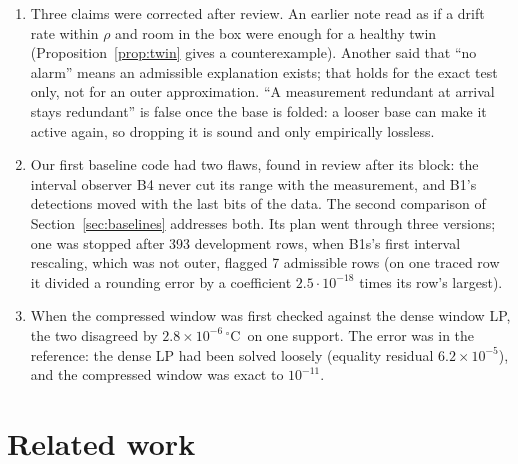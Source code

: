 \documentclass[11pt,a4paper]{article}
\newcommand{\degC}{\ensuremath{{}^\circ}C}
\newcommand{\sci}[2]{\ensuremath{#1\times10^{#2}}}
\begin{document}
\begin{enumerate}
  the first validation already showed it: the float32 build of the 16-number template detected 430098 (drift
  0.002\,\degC/s, rw) at 906, 240\,s after IM. The validation was then written to claim Theorem~\ref{thm:dom} for
  float64 only.
\item Three claims were corrected after review. An earlier note read as if a drift rate within $\rho$ and room in the
  box were enough for a healthy twin (Proposition~\ref{prop:twin} gives a counterexample). Another said that ``no
  alarm'' means an admissible explanation exists; that holds for the exact test only, not for an outer approximation.
  ``A measurement redundant at arrival stays redundant'' is false once the base is folded: a looser base can make it
  active again, so dropping it is sound and only empirically lossless.
\item Our first baseline code had two flaws, found in review after its block: the interval observer B4 never cut its
  range with the measurement, and B1's detections moved with the last bits of the data. The second comparison of
  Section~\ref{sec:baselines} addresses both. Its plan went through three versions; one was stopped after 393
  development rows, when B1s's first interval rescaling, which was not outer, flagged 7 admissible rows (on one
  traced row it divided a rounding error by a coefficient $2.5\cdot10^{-18}$ times its row's largest).
\item When the compressed window was first checked against the dense window LP, the two disagreed by
  \sci{2.8}{-6}\,\degC\ on one support. The error was in the reference: the dense LP had been solved loosely (equality
  residual \sci{6.2}{-5}), and the compressed window was exact to $10^{-11}$.
\end{enumerate}

\section{Related work}\label{sec:related}
\end{document}
